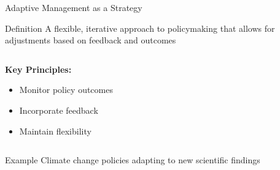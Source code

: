 \documentclass[10pt]{beamer}
\begin{document}
\begin{frame}{Adaptive Management as a Strategy}
    \begin{block}{Definition}
        A flexible, iterative approach to policymaking that allows for adjustments based on feedback and outcomes
    \end{block}
    
    \begin{columns}[T]
        \begin{column}{0.6\textwidth}
            \textbf{Key Principles:}
            \begin{itemize}
                \item Monitor policy outcomes
                \item Incorporate feedback
                \item Maintain flexibility
            \end{itemize}
        \end{column}
        \begin{column}{0.4\textwidth}
        \end{column}
    \end{columns}
    
    \begin{exampleblock}{Example}
        Climate change policies adapting to new scientific findings
    \end{exampleblock}
\end{frame}
\end{document}
